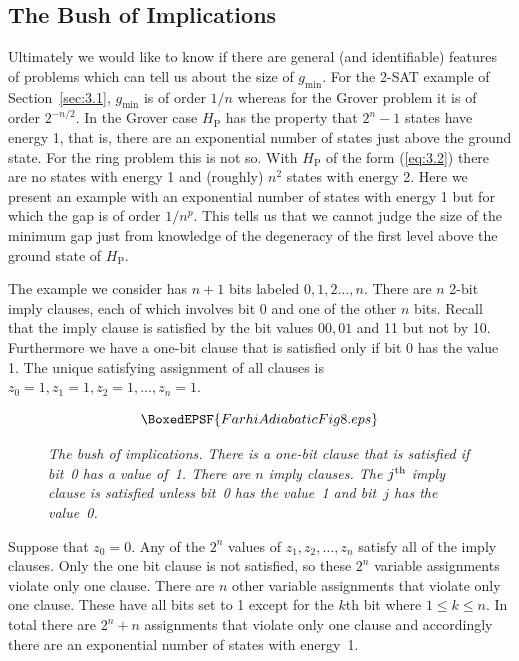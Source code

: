 \documentclass[twoside]{article}
\newcommand{\refEq}[1]{(\ref{eq:#1})}
\newcommand{\numFig}[3]{\begin{figure}[ht]
 $$\BoxedEPSF{#3}$$
    \caption{#2}\label{fig:#1}
   \end{figure}}
\newcommand{\rP}{{\mathrm{P}}}
\newcommand{\gm}{g_{\min}}
\numberwithin{equation}{section}
\begin{document}
\subsection{The Bush of Implications}\label{sec:3.3}
\label{sec:bush} Ultimately we would like to know if there are general (and
identifiable) features of problems which can tell us about the size of
$\gm$.  For the 2-SAT example of Section~\ref{sec:3.1}, $\gm$ is of order
$1/n$ whereas for the Grover problem it is of order $2^{-n/2}$.  In the
Grover case $H_\rP$ has the property that $2^n-1$ states have energy 1,
that is, there are an exponential number of states  just above the ground
state.  For the ring problem this is not so.  With $H_\rP$ of the form
\refEq{3.2} there are no states with energy 1 and (roughly) $n^2$ states
with energy 2.  Here we present an example with an exponential number
of states with energy 1 but for which the gap is of order
$1/n^p$.  This tells us that we cannot judge the size of the minimum gap
just from knowledge of the degeneracy of the first level above the ground
state of
$H_\rP$. 

The example we consider has $n+1$ bits labeled $0,1,2\dots,n$.  There are
$n$ 2-bit imply clauses, each of which involves bit 0 and one of the other
$n$ bits.  Recall that the imply clause is satisfied by the bit values $00,01$
and 11 but not by 10.  Furthermore we have a one-bit clause that is
satisfied only if bit 0 has the value 1.  The unique satisfying assignment of
all clauses is
$z_0=1, z_1=1, z_2=1, \dots,z_n=1$.

\numFig{8}{\slshape  The bush of implications. There is a one-bit clause
that  is satisfied if bit~0 has a value of~1. There are $n$ imply clauses. The
$j^{\rm th}$ imply clause is satisfied unless bit~0 has the value~1 and
bit~$j$ has the value~0.}{FarhiAdiabaticFig8.eps}

Suppose that $z_0=0$.  Any of the $2^n$ values of $z_1, z_2, \dots,z_n$
satisfy all of the imply clauses.  Only the one bit clause is not satisfied, so
these $2^n$ variable assignments violate only one clause.  There are $n$
other variable assignments that violate only one clause.  These have all bits
set to 1 except for the $k$th bit where $1\le k\le n$.  In total there are
$2^n+n$ assignments that violate only one clause and accordingly there are
an exponential number of states with energy~1.
\end{document}
